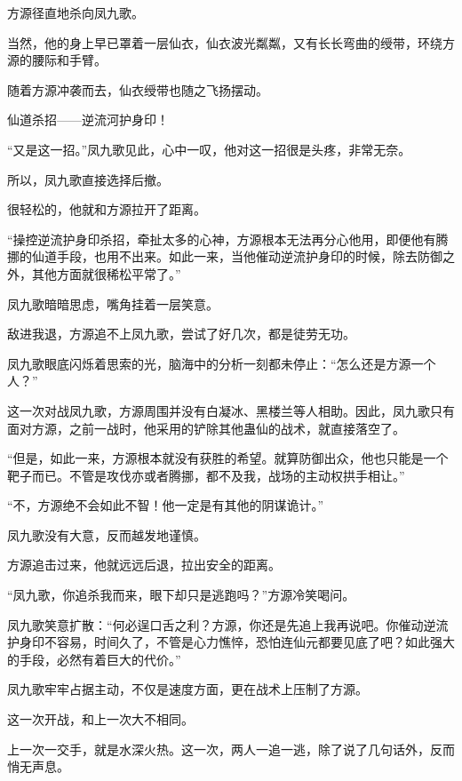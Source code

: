
\begin{this_body}



方源径直地杀向凤九歌。

当然，他的身上早已罩着一层仙衣，仙衣波光粼粼，又有长长弯曲的绶带，环绕方源的腰际和手臂。

随着方源冲袭而去，仙衣绶带也随之飞扬摆动。

仙道杀招——逆流河护身印！

“又是这一招。”凤九歌见此，心中一叹，他对这一招很是头疼，非常无奈。

所以，凤九歌直接选择后撤。

很轻松的，他就和方源拉开了距离。

“操控逆流护身印杀招，牵扯太多的心神，方源根本无法再分心他用，即便他有腾挪的仙道手段，也用不出来。如此一来，当他催动逆流护身印的时候，除去防御之外，其他方面就很稀松平常了。”

凤九歌暗暗思虑，嘴角挂着一层笑意。

敌进我退，方源追不上凤九歌，尝试了好几次，都是徒劳无功。

凤九歌眼底闪烁着思索的光，脑海中的分析一刻都未停止：“怎么还是方源一个人？”

这一次对战凤九歌，方源周围并没有白凝冰、黑楼兰等人相助。因此，凤九歌只有面对方源，之前一战时，他采用的铲除其他蛊仙的战术，就直接落空了。

“但是，如此一来，方源根本就没有获胜的希望。就算防御出众，他也只能是一个靶子而已。不管是攻伐亦或者腾挪，都不及我，战场的主动权拱手相让。”

“不，方源绝不会如此不智！他一定是有其他的阴谋诡计。”

凤九歌没有大意，反而越发地谨慎。

方源追击过来，他就远远后退，拉出安全的距离。

“凤九歌，你追杀我而来，眼下却只是逃跑吗？”方源冷笑喝问。

凤九歌笑意扩散：“何必逞口舌之利？方源，你还是先追上我再说吧。你催动逆流护身印不容易，时间久了，不管是心力憔悴，恐怕连仙元都要见底了吧？如此强大的手段，必然有着巨大的代价。”

凤九歌牢牢占据主动，不仅是速度方面，更在战术上压制了方源。

这一次开战，和上一次大不相同。

上一次一交手，就是水深火热。这一次，两人一追一逃，除了说了几句话外，反而悄无声息。


\end{this_body}
